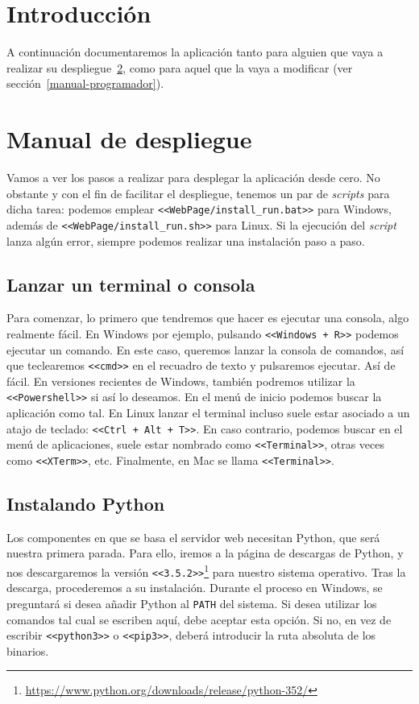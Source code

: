 
\section{Introducción}
A continuación documentaremos la aplicación tanto para alguien que vaya a realizar su despliegue~\ref{manual-despliegue}, como para aquel que la vaya a modificar (ver sección~\ref{manual-programador}).

\section{Manual de despliegue}\label{manual-despliegue}
Vamos a ver los pasos a realizar para desplegar la aplicación desde cero. No obstante y con el fin de facilitar el despliegue, tenemos un par de \textit{scripts} para dicha tarea: 
podemos emplear \texttt{<<WebPage/install\_run.bat>>} para Windows, además de \texttt{<<WebPage/install\_run.sh>>} para Linux. Si la ejecución del \textit{script} lanza algún error, siempre podemos realizar una instalación paso a paso.

\subsection{Lanzar un terminal o consola}
Para comenzar, lo primero que tendremos que hacer es ejecutar una consola, algo realmente fácil. En Windows por ejemplo, pulsando \texttt{<<Windows + R>>} podemos ejecutar un comando. En este caso, queremos lanzar la consola de comandos, así que teclearemos \texttt{<<cmd>>} en el recuadro de texto y pulsaremos ejecutar. Así de fácil.
En versiones recientes de Windows, también podremos utilizar la \texttt{<<Powershell>>} si así lo deseamos. En el menú de inicio podemos buscar la aplicación como tal.
En Linux lanzar el terminal incluso suele estar asociado a un atajo de teclado: \texttt{<<Ctrl + Alt + T>>}. En caso contrario, podemos buscar en el menú de aplicaciones, suele estar nombrado como \texttt{<<Terminal>>}, otras veces como \texttt{<<XTerm>>}, etc.
Finalmente, en Mac se llama \texttt{<<Terminal>>}.

\subsection{Instalando Python}\label{instalar-python}
Los componentes en que se basa el servidor web necesitan Python, que será nuestra primera parada. Para ello, iremos a la página de descargas de Python, y nos descargaremos la versión \texttt{<<3.5.2>>}\footnote{\url{https://www.python.org/downloads/release/python-352/}} para nuestro sistema operativo. Tras la descarga, procederemos a su instalación. Durante el proceso en Windows, se preguntará si desea añadir Python al \texttt{PATH} del sistema. Si desea utilizar los comandos tal cual se escriben aquí, debe aceptar esta opción. Si no, en vez de escribir \texttt{<<python3>>} o \texttt{<<pip3>>}, deberá introducir la ruta absoluta de los binarios.


